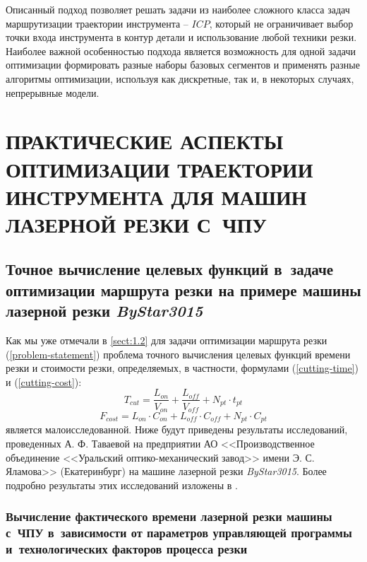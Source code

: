 \documentclass[11pt,twoside,openany]{report}
\newcounter{lem}
\begin{document}
Описанный подход позволяет решать задачи из
наиболее сложного класса задач маршрутизации
траектории инструмента -- $ICP$,
который не ограничивает выбор точки входа
инструмента в контур детали и использование
любой техники резки.
Наиболее важной особенностью подхода
является возможность для одной задачи оптимизации
формировать разные наборы базовых сегментов и
применять разные алгоритмы оптимизации,
используя как дискретные, так и,
в некоторых случаях, непрерывные модели.


\chapter{
  ПРАКТИЧЕСКИЕ АСПЕКТЫ ОПТИМИЗАЦИИ ТРАЕКТОРИИ ИНСТРУМЕНТА
  ДЛЯ МАШИН ЛАЗЕРНОЙ РЕЗКИ С~ЧПУ
}
\setcounter{chapter}{2}
\setcounter{equation}{0}

{\raggedright\section{
  Точное вычисление целевых функций
  в~задаче оптимизации маршрута резки
  на примере машины лазерной резки
  {\it ByStar3015}
}}
\label{sect:2.1}
\setcounter{equation}{0}

Как мы уже  отмечали в \ref{sect:1.2}
для задачи оптимизации маршрута резки (\ref{problem-statement})
проблема точного вычисления целевых функций времени резки и стоимости резки,
определяемых, в частности, формулами (\ref{cutting-time}) и (\ref{cutting-cost}):
$$
T_{cut} = \frac{L_{on}}{V_{on}} + \frac{L_{off}}{V_{off}} +N_{pt} \cdot t_{pt}
$$
$$
F_{cost}=
L_{on} \cdot C_{on} +
L_{off} \cdot C_{off} +
N_{pt} \cdot C_{pt}
$$
является малоисследованной.
Ниже будут приведены результаты исследований,
проведенных А. Ф. Таваевой на предприятии
АО <<Производственное объединение <<Уральский оптико-механический завод>>
имени Э. С. Яламова>>
(Екатеринбург)
на машине лазерной резки
{\it ByStar3015}.
Более подробно результаты этих исследований изложены в
\cite{intro45,intro46,intro47}.

{\raggedright\subsection{
  Вычисление фактического времени лазерной резки
  машины с~ЧПУ
  в~зависимости от параметров управляющей программы
  и~технологических факторов процесса резки
}}
\end{document}
